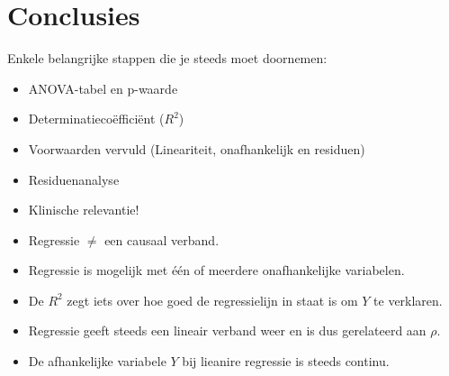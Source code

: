 \documentclass[
]{book}
\providecommand{\tightlist}{%
  \setlength{\itemsep}{0pt}\setlength{\parskip}{0pt}}
\theoremstyle{definition}
\theoremstyle{definition}
\theoremstyle{definition}
\theoremstyle{definition}
\theoremstyle{remark}
\begin{document}
\hypertarget{conclusies-1}{%
\section*{Conclusies}\label{conclusies-1}}


Enkele belangrijke stappen die je steeds moet doornemen:

\begin{itemize}
\tightlist
\item
  ANOVA-tabel en p-waarde
\item
  Determinatiecoëfficiënt (\(R^2\))
\item
  Voorwaarden vervuld (Lineariteit, onafhankelijk en residuen)
\item
  Residuenanalyse
\item
  Klinische relevantie!
\end{itemize}

\begin{itemize}
\tightlist
\item
  Regressie \(\neq\) een causaal verband.
\item
  Regressie is mogelijk met één of meerdere onafhankelijke variabelen.
\item
  De \(R^2\) zegt iets over hoe goed de regressielijn in staat is om \(Y\) te verklaren.
\item
  Regressie geeft steeds een lineair verband weer en is dus gerelateerd aan \(\rho\).
\item
  De afhankelijke variabele \(Y\) bij lieanire regressie is steeds continu.
\end{itemize}
\end{document}
